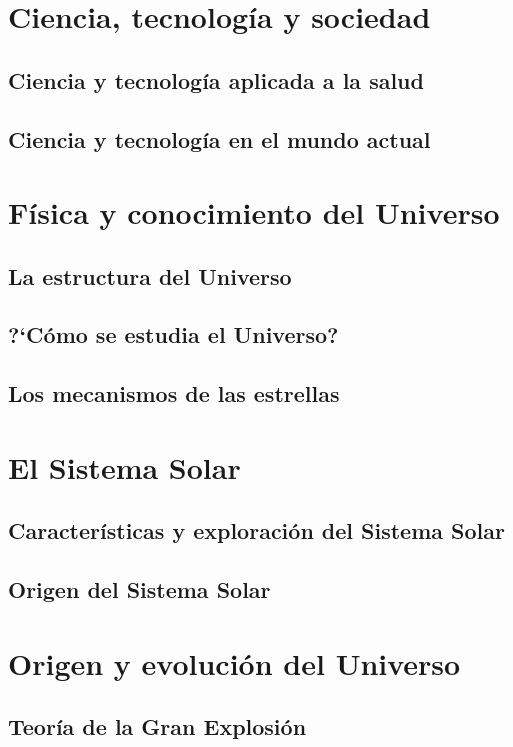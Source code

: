 \documentclass[11pt]{book}
\begin{document}
\section{ Ciencia, tecnolog\'ia y sociedad}
\subsection{Ciencia y tecnolog\'ia aplicada a la salud}
\subsection{Ciencia y tecnolog\'ia en el mundo actual}
\newpage \thispagestyle{plain}
\section{ F\'isica y conocimiento del Universo}
\subsection{La estructura del Universo}
\subsection{?`C\'omo se estudia el Universo?}
\subsection{Los mecanismos de las estrellas}

\newpage \thispagestyle{plain}
\section{ El Sistema Solar}
\subsection{Caracter\'isticas y exploraci\'on del Sistema Solar}
\subsection{Origen del Sistema Solar}

\newpage \thispagestyle{plain}
\section{ Origen y evoluci\'on del Universo}
\subsection{Teor\'ia de la Gran Explosi\'on}
\end{document}
